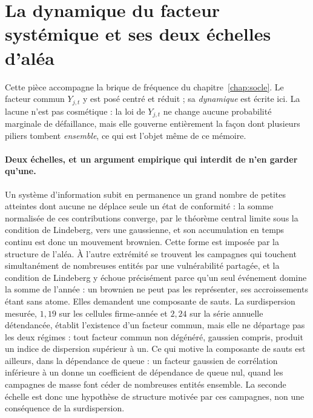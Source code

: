 \section{La dynamique du facteur systémique et ses deux échelles d'aléa}
\label{sec:dynamique-Y}

Cette pièce accompagne la brique de fréquence du chapitre~\ref{chap:socle}. Le facteur commun
$Y_{j,t}$ y est posé centré et réduit ; sa \emph{dynamique} est écrite ici. La lacune n'est pas cosmétique : la loi de $Y_{j,t}$ ne change aucune probabilité
marginale de défaillance, mais elle gouverne entièrement la façon dont plusieurs piliers
tombent \emph{ensemble}, ce qui est l'objet même de ce mémoire.

\paragraph{Deux échelles, et un argument empirique qui interdit de n'en garder qu'une.}
Un système d'information subit en permanence un grand nombre de petites atteintes dont aucune
ne déplace seule un état de conformité : la somme normalisée de ces contributions converge, par
le théorème central limite sous la condition de Lindeberg, vers une gaussienne, et son
accumulation en temps continu est donc un mouvement brownien. Cette forme est imposée par la
structure de l'aléa. À l'autre extrémité se trouvent
les campagnes qui touchent simultanément de nombreuses entités par une vulnérabilité partagée,
et la condition de Lindeberg y échoue précisément parce qu'un seul événement domine la
somme de l'année : un brownien ne peut pas les représenter, ses accroissements étant sans
atome. Elles demandent une composante de sauts. La surdispersion mesurée, $1{,}19$ sur les
cellules firme-année et $2{,}24$ sur la série annuelle
détendancée, établit l'existence d'un facteur commun, mais elle ne départage pas les deux
régimes : tout facteur commun non dégénéré, gaussien compris, produit un indice de dispersion
supérieur à un. Ce qui motive la composante de sauts est ailleurs, dans la dépendance de queue :
un facteur gaussien de corrélation inférieure à un donne un coefficient de dépendance de queue
nul, quand les campagnes de masse font céder de nombreuses entités ensemble. La seconde échelle
est donc une hypothèse de structure motivée par ces campagnes, non une conséquence de la
surdispersion.

